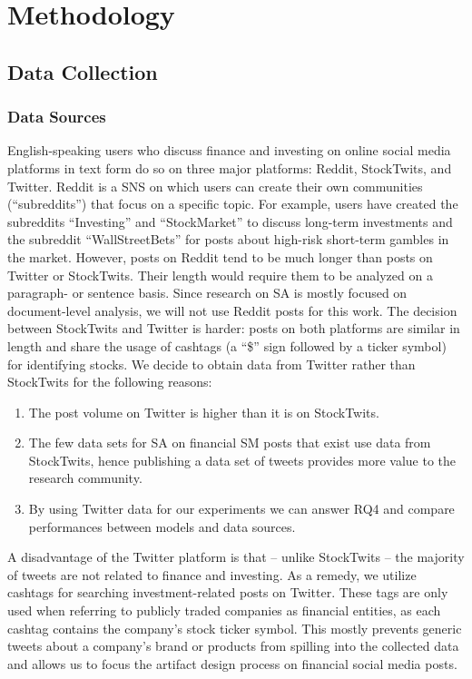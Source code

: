 \section{Methodology}
\subsection{Data Collection}
\subsubsection{Data Sources}
English-speaking users who discuss finance and investing on online social media platforms in text form do so on three major platforms: Reddit, StockTwits, and Twitter. Reddit is a SNS on which users can create their own communities (``subreddits'') that focus on a specific topic. For example, users have created the subreddits ``Investing'' and ``StockMarket'' to discuss long-term investments and the subreddit ``WallStreetBets'' for posts about high-risk short-term gambles in the market. However, posts on Reddit tend to be much longer than posts on Twitter or StockTwits. Their length would require them to be analyzed on a paragraph- or sentence basis. Since research on SA is mostly focused on document-level analysis, we will not use Reddit posts for this work. The decision between StockTwits and Twitter is harder: posts on both platforms are similar in length and share the usage of cashtags (a ``\$'' sign followed by a ticker symbol) for identifying stocks. We decide to obtain data from Twitter rather than StockTwits for the following reasons:
\begin{enumerate}[noitemsep]
	\item The post volume on Twitter is higher than it is on StockTwits.
	\item The few data sets for SA on financial SM posts that exist use data from StockTwits, hence publishing a data set of tweets provides more value to the research community.
	\item By using Twitter data for our experiments we can answer RQ4 and compare performances between models and data sources.
\end{enumerate}

A disadvantage of the Twitter platform is that -- unlike StockTwits -- the majority of tweets are not related to finance and investing. As a remedy, we utilize cashtags for searching investment-related posts on Twitter. These tags are only used when referring to publicly traded companies as financial entities, as each cashtag contains the company's stock ticker symbol. This mostly prevents generic tweets about a company's brand or products from spilling into the collected data and allows us to focus the artifact design process on financial social media posts.

